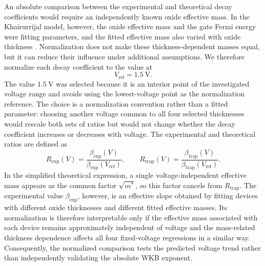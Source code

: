 \documentclass[12pt]{article}
\begin{document}
An absolute comparison between the experimental and theoretical decay coefficients would require an independently known oxide effective mass. In the Khairurrijal model, however, the oxide effective mass and the gate Fermi energy were fitting parameters, and the fitted effective mass also varied with oxide thickness \cite{khairurrijal2000}. Normalization does not make these thickness-dependent masses equal, but it can reduce their influence under additional assumptions. We therefore normalize each decay coefficient to the value at
\[
    V_{\mathrm{ref}}=1.5~\mathrm{V}.
\]
The value \(1.5~\mathrm{V}\) was selected because it is an interior point of the investigated voltage range and avoids using the lowest-voltage point as the normalization reference. The choice is a normalization convention rather than a fitted parameter: choosing another voltage common to all four selected thicknesses would rescale both sets of ratios but would not change whether the decay coefficient increases or decreases with voltage. The experimental and theoretical ratios are defined as
\begin{equation}
    R_{\mathrm{exp}}(V)
    =
    \frac{\beta_{\mathrm{exp}}(V)}
    {\beta_{\mathrm{exp}}(V_{\mathrm{ref}})},
    \qquad
    R_{\mathrm{trap}}(V)
    =
    \frac{\beta_{\mathrm{trap}}(V)}
    {\beta_{\mathrm{trap}}(V_{\mathrm{ref}})}.
    \label{eq:normalized-decay-coefficients}
\end{equation}
In the simplified theoretical expression, a single voltage-independent effective mass appears as the common factor \(\sqrt{m^*}\), so this factor cancels from \(R_{\mathrm{trap}}\). The experimental value \(\beta_{\mathrm{exp}}\), however, is an effective slope obtained by fitting devices with different oxide thicknesses and different fitted effective masses. Its normalization is therefore interpretable only if the effective mass associated with each device remains approximately independent of voltage and the mass-related thickness dependence affects all four fixed-voltage regressions in a similar way. Consequently, the normalized comparison tests the predicted voltage trend rather than independently validating the absolute WKB exponent.
\end{document}
